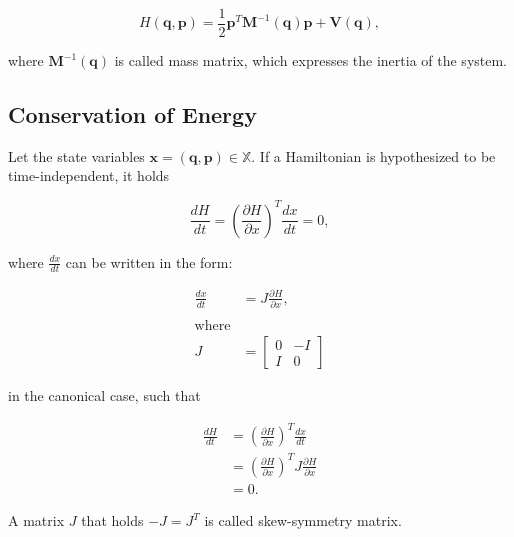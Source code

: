 \documentclass[
	parskip, 			   %
	twoside, 			   %
	DIV=14, 			   %
	BCOR=15.0mm, 		   %
	headsepline, 		   %
	open=right, 		   %
	captions=tableheading, %
	bibliography=totoc,    %
	numbers=noenddot       %
]{scrreprt}
\begin{document}
\begin{equation}
    \label{eq:Hamiltonian}
    H(\mathbf{q},\mathbf{p})=\frac{1}{2}\mathbf{p}^T\mathbf{M}^{-1}(\mathbf{q})\mathbf{p} + \mathbf{V}(\mathbf{q}),
\end{equation}

where $\mathbf{M}^{-1}(\mathbf{q})$ is called mass matrix, which expresses the inertia of the system.

\subsection{Conservation of Energy}
Let the state variables $\mathbf{x}=(\mathbf{q},\mathbf{p}) \in \mathbb{X}$. If a Hamiltonian is hypothesized to be time-independent, it holds

\begin{equation}
    \label{eq:Hamiltonian_invariant}
    \frac{dH}{dt} = (\frac{\partial H}{\partial x})^T \frac{dx}{dt} = 0,
\end{equation}

where $\frac{dx}{dt}$ can be written in the form:

\begin{equation}
    \label{eq:Hamiltonian_symplectic}
    \begin{aligned}
        \frac{dx}{dt} &= J \frac{\partial H}{\partial x},\\\\
        \text{where}\\
        J &= \left[ \begin{array}{cc}
            0 & -I \\
            I & 0
        \end{array} \right]
    \end{aligned}
\end{equation}

in the canonical case, such that 

\begin{equation}
    \label{eq:Hamiltonian_symplectic_conclusion}
    \begin{aligned}
        \frac{dH}{dt} &= (\frac{\partial H}{\partial x})^T \frac{dx}{dt}\\
         &= (\frac{\partial H}{\partial x})^T J \frac{\partial H}{\partial x} \\
         &= 0.
    \end{aligned}
\end{equation}

A matrix $J$ that holds $-J = J^T$ is called skew-symmetry matrix.
\end{document}
